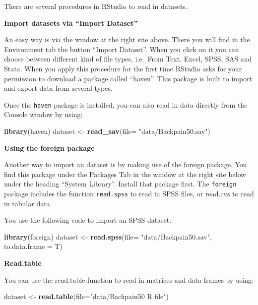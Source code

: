 \documentclass[
]{book}
\newenvironment{Shaded}{\begin{snugshade}}{\end{snugshade}}
\newcommand{\DataTypeTok}[1]{\textcolor[rgb]{0.13,0.29,0.53}{#1}}
\newcommand{\KeywordTok}[1]{\textcolor[rgb]{0.13,0.29,0.53}{\textbf{#1}}}
\newcommand{\NormalTok}[1]{#1}
\newcommand{\StringTok}[1]{\textcolor[rgb]{0.31,0.60,0.02}{#1}}
\begin{document}
There are several procedures in RStudio to read in datasets.

\textbf{Import datasets via ``Import Dataset''}

An easy way is via the window at the right site above. There you will find in the Environment tab the button ``Import Dataset''. When you click on it you can choose between different kind of file types, i.e.~From Text, Excel, SPSS, SAS and Stata. When you apply this procedure for the first time RStudio asks for your permission to download a package called ``haven''. This package is built to import and export data from several types.

Once the \texttt{haven} package is installed, you can also read in data directly from the Console window by using:

\begin{Shaded}
\begin{Highlighting}[]
\KeywordTok{library}\NormalTok{(haven)}
\NormalTok{dataset <-}\StringTok{ }\KeywordTok{read_sav}\NormalTok{(}\DataTypeTok{file=} \StringTok{"data/Backpain50.sav"}\NormalTok{)}
\end{Highlighting}
\end{Shaded}

\textbf{Using the foreign package}

Another way to import an dataset is by making use of the foreign package. You find this package under the Packages Tab in the window at the right site below under the heading ``System Library''. Install that package first. The \texttt{foreign} package includes the function \texttt{read.spss} to read in SPSS files, or read.cvs to read in tabular data.

You use the following code to import an SPSS dataset:

\begin{Shaded}
\begin{Highlighting}[]
\KeywordTok{library}\NormalTok{(foreign)}
\NormalTok{dataset <-}\StringTok{ }\KeywordTok{read.spss}\NormalTok{(}\DataTypeTok{file=} \StringTok{"data/Backpain50.sav"}\NormalTok{, }\DataTypeTok{to.data.frame =}\NormalTok{ T)}
\end{Highlighting}
\end{Shaded}

\textbf{Read.table}

You can use the read.table function to read in matrices and data frames by using:

\begin{Shaded}
\begin{Highlighting}[]
\NormalTok{dataset <-}\StringTok{ }\KeywordTok{read.table}\NormalTok{(}\DataTypeTok{file=}\StringTok{"data/Backpain50 R file"}\NormalTok{)}
\end{Highlighting}
\end{Shaded}
\end{document}
